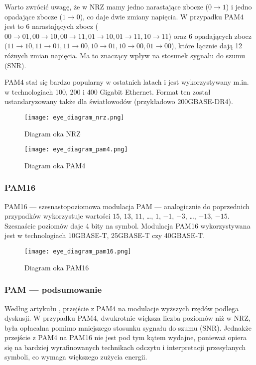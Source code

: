 Warto zwrócić uwagę, że w NRZ mamy jedno narastające zbocze ($0 \rightarrow 1$) i jedno opadające zbocze ($1 \rightarrow 0$), co daje dwie zmiany napięcia. W przypadku PAM4 jest to 6 narastających zbocz
($00 \rightarrow 01, 00 \rightarrow 10, 00 \rightarrow 11, 01 \rightarrow 10, 01 \rightarrow 11, 10 \rightarrow 11$) oraz 6 opadających zbocz
($11 \rightarrow 10, 11 \rightarrow 01, 11 \rightarrow 00, 10 \rightarrow 01, 10 \rightarrow 00, 01 \rightarrow 00$), które łącznie dają 12 różnych zmian napięcia.
Ma to znaczący wpływ na stosunek sygnału do szumu (SNR).

PAM4 stał się bardzo popularny w ostatnich latach i jest wykorzystywany m.in. w technologiach 100, 200 i 400 Gigabit Ethernet. Format ten został ustandaryzowany
także dla światłowodów (przykładowo 200GBASE-DR4).

\begin{figure}[ht]
    \centering
    \texttt{[image: eye\_diagram\_nrz.png]}
    \caption{Diagram oka NRZ}
    \label{fig:diagram_oka_nrz}
\end{figure}

\begin{figure}[ht]
    \centering
    \texttt{[image: eye\_diagram\_pam4.png]}
    \caption{Diagram oka PAM4}
    \label{fig:diagram_oka_pam4}
\end{figure}

\subsubsection{PAM16}

PAM16 --- szesnastopoziomowa modulacja PAM --- analogicznie do poprzednich przypadków wykorzystuje wartości $15$, $13$, $11$, \dots , $1$, $-1$, $-3$, \dots , $-13$, $-15$. Szesnaście poziomów daje 4 bity na symbol.
Modulacja PAM16 wykorzystywana jest w technologiach 10GBASE-T, 25GBASE-T czy 40GBASE-T.

\begin{figure}[ht]
    \centering
    \texttt{[image: eye\_diagram\_pam16.png]}
    \caption{Diagram oka PAM16}
    \label{fig:diagram_oka_pam16}
\end{figure}

\subsubsection{PAM --- podsumowanie}

Według artykułu \cite{Higher-order-modulation}, przejście z PAM4 na modulacje wyższych rzędów podlega dyskusji. W przypadku PAM4, dwukrotnie większa liczba
poziomów niż w NRZ, była opłacalna pomimo mniejszego stosunku sygnału do szumu (SNR). Jednakże przejście z PAM4 na PAM16 nie jest pod tym kątem wydajne, ponieważ
opiera się na bardziej wyrafinowanych technikach odczytu i interpretacji przesyłanych symboli, co wymaga większego zużycia energii.

